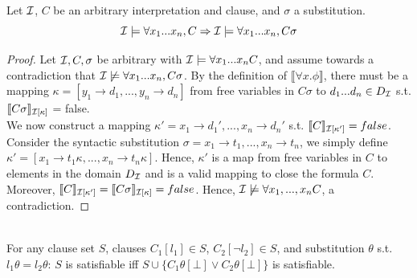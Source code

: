 \begin{lemma}\label{lem:2}
Let $\mathcal{I}$, $C$ be an arbitrary interpretation and clause, and $\sigma$ a substitution.
\[\mathcal{I} \models \forall x_1...x_n, C \Rightarrow \mathcal{I} \models \forall x_1...x_n, C\sigma\]
\end{lemma}
\begin{proof}
  Let $\mathcal{I}, C, \sigma$ be arbitrary with $\mathcal{I} \models \forall x_1...x_n C$, and assume towards a contradiction that $\mathcal{I} \not\models \forall x_1...x_n, C\sigma$. By the definition of $\llbracket \forall x. \phi\rrbracket$, there must be a mapping $\kappa = [y_1 \to d_1,...,y_n\to d_n]$ from free variables in $C\sigma$ to $d_1...d_n \in D_{\mathcal{I}}$ s.t. $\llbracket C\sigma\rrbracket_{\mathcal{I}[\kappa]}$ = false.\\
  We now construct a mapping $\kappa' = x_1 \to d_1', ..., x_n \to d_n'$ s.t. $\llbracket C \rrbracket_{\mathcal{I}[\kappa']}= false$.
  Consider the syntactic substitution $\sigma = x_1 \to t_1,...,x_n \to t_n$, we simply define $\kappa' = [x_1 \to t_1\kappa, ..., x_n \to t_n\kappa]$. Hence, $\kappa'$ is a map from free variables in $C$ to elements in the domain $D_{\mathcal{I}}$ and is a valid mapping to close the formula $C$. Moreover, $\llbracket C\rrbracket_{\mathcal{I}[\kappa']} = \llbracket C\sigma\rrbracket_{\mathcal{I}[\kappa]} = false$.
  Hence, $\mathcal{I} \not \models \forall x_1,...,x_n C$, a contradiction.
\end{proof}

\begin{theorem}$ $\\
  For any clause set $S$, clauses $C_1[l_1] \in S$, $C_2[\neg l_2] \in S$, and substitution $\theta$ s.t. $l_1\theta = l_2\theta$:
  $S$ is satisfiable iff $S \cup \{C_1\theta[\bot] \lor C_2\theta[\bot]\}$ is satisfiable.
\end{theorem}


